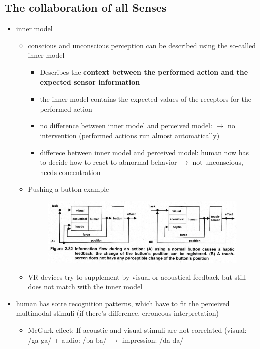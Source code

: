 \documentclass{standalone}
\begin{document}
\subsection{The collaboration of all Senses}
\begin{itemize}		
	\item inner model 
		\begin{itemize}
			\item conscious and unconscious perception can be described using the so-called inner model
			\begin{itemize}
				\item Describes the \textbf{context between the performed action and the expected sensor information}
				\item the inner model contains the expected values of the receptors for the performed action
				\item no difference between inner model and perceived model: $\rightarrow$ no intervention (performed actions run almost automatically)
				\item differece between inner model and perceived model: human now has to decide how to react to abnormal behavior $\rightarrow$ not unconscious, needs concentration
			\end{itemize}
			\item Pushing a button example
			\begin{figure}[H]
					\centering
					\includegraphics[width = 0.7\linewidth]{Figures/2_82.png}
			\end{figure}
			\item VR devices try to supplement by visual or acoustical feedback but still does not match with the inner model 
		\end{itemize}
	\item human has sotre recognition patterns, which have to fit the perceived multimodal stimuli (if there's difference, erroneous interpretation)
		\begin{itemize}
			\item McGurk effect: If acoustic and visual stimuli are not correlated (visual: /ga-ga/ + audio: /ba-ba/ $\rightarrow$ impression: /da-da/ 
		\end{itemize}

\end{itemize}
\end{document}
